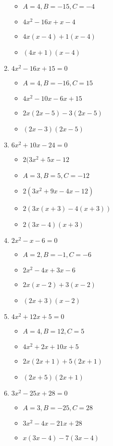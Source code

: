 \begin{enumerate}
  \begin{itemize}
  \item $A=4, B=-15, C=-4$
  \item $4x^{2}-16x+x-4$
  \item $4x(x-4)+1(x-4)$
  \item $(4x+1)(x-4)$
  \end{itemize}
\item $4x^{2} - 16x + 15 = 0$
  \begin{itemize}
  \item $A=4, B=-16, C=15$
  \item $4x^{2}-10x-6x+15$
  \item $2x(2x-5)-3(2x-5)$
  \item $(2x-3)(2x-5)$
  \end{itemize}
\item $6x^{2} + 10x - 24 = 0$
  \begin{itemize}
  \item $2(3x^{2}+5x-12$
  \item $A=3, B=5, C=-12$
  \item $2(3x^{2}+9x-4x-12)$
  \item $2(3x(x+3)-4(x+3))$
  \item $2(3x-4)(x+3)$
  \end{itemize}
\item $2x^{2} - x - 6 = 0$
  \begin{itemize}
  \item $A=2, B=-1, C=-6$
  \item $2x^{2}-4x+3x-6$
  \item $2x(x-2)+3(x-2)$
  \item $(2x+3)(x-2)$
  \end{itemize}
\item $4x^{2} + 12x + 5 = 0$
  \begin{itemize}
  \item $A=4, B=12, C=5$
  \item $4x^{2}+2x+10x+5$
  \item $2x(2x+1)+5(2x+1)$
  \item $(2x+5)(2x+1)$
  \end{itemize}
\item $3x^{2} - 25x + 28 = 0$
  \begin{itemize}
  \item $A=3, B=-25, C=28$
  \item $3x^{2}-4x-21x+28$
  \item $x(3x-4)-7(3x-4)$

\end{itemize}
\end{enumerate}
